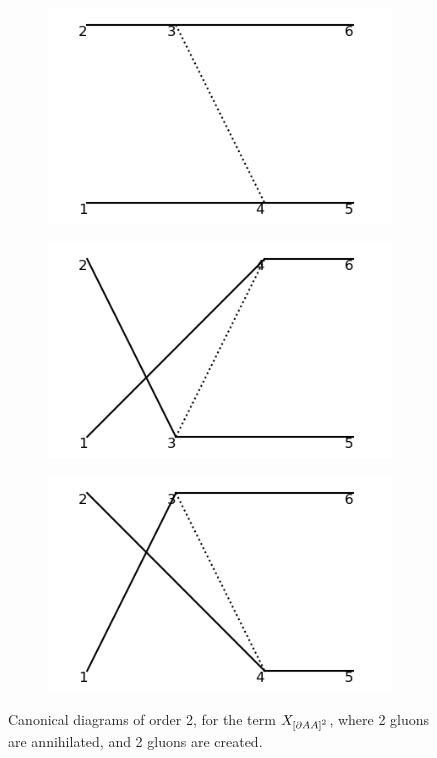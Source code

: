\documentclass[11pt,a4paper,twoside,pdf]{article}
\numberwithin{equation}{section}
\begin{document}
\begin{figure}[h!]
\begin{subfigure}[t]{0.24\textwidth}
        \centering
        \includegraphics[width=\textwidth]{plots/canonical/order2/6.png}
        \caption{ }
    \end{subfigure}
    \begin{subfigure}[t]{0.24\textwidth}
        \centering
        \includegraphics[width=\textwidth]{plots/canonical/order2/7.png}
        \caption{ }
    \end{subfigure}
    \begin{subfigure}[t]{0.24\textwidth}
        \centering
        \includegraphics[width=\textwidth]{plots/canonical/order2/8.png}
        \caption{ }
    \end{subfigure}
    \caption{Canonical diagrams of order 2, for the term $X_{\left[ \partial AA \right]^2}$, 
    where 2 gluons are annihilated, and 2 gluons are created.}
    \label{fig:cannonical2_2to2}
\end{figure}
\end{document}
